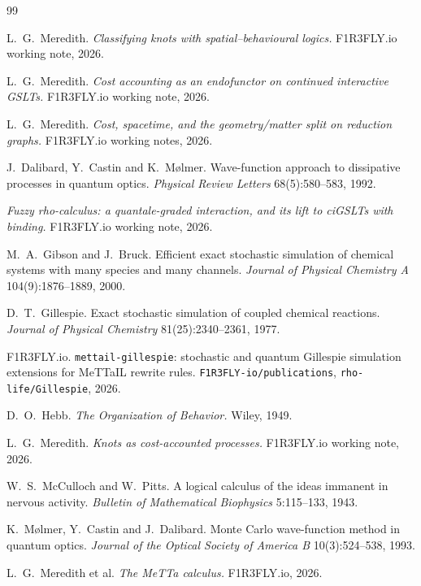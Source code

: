\documentclass[11pt,a4paper]{article}
\theoremstyle{plain}
\theoremstyle{definition}
\theoremstyle{remark}
\begin{document}
\begin{thebibliography}{99}

 L.\ G.\ Meredith. \emph{Classifying knots with spatial--behavioural logics.}
F1R3FLY.io working note, 2026.

 L.\ G.\ Meredith. \emph{Cost accounting as an endofunctor on continued
interactive GSLTs.} F1R3FLY.io working note, 2026.

 L.\ G.\ Meredith. \emph{Cost, spacetime, and the geometry/matter split on
reduction graphs.} F1R3FLY.io working notes, 2026.

 J.\ Dalibard, Y.\ Castin and K.\ M\o lmer. Wave-function approach to dissipative
processes in quantum optics. \emph{Physical Review Letters} 68(5):580--583, 1992.

 \emph{Fuzzy rho-calculus: a quantale-graded interaction, and its lift to ciGSLTs with
binding.} F1R3FLY.io working note, 2026.

 M.\ A.\ Gibson and J.\ Bruck. Efficient exact stochastic simulation of
chemical systems with many species and many channels. \emph{Journal of Physical Chemistry A}
104(9):1876--1889, 2000.

 D.\ T.\ Gillespie. Exact stochastic simulation of coupled chemical reactions.
\emph{Journal of Physical Chemistry} 81(25):2340--2361, 1977.

 F1R3FLY.io. \texttt{mettail-gillespie}: stochastic and quantum Gillespie
simulation extensions for MeTTaIL rewrite rules. \texttt{F1R3FLY-io/publications},
\texttt{rho-life/Gillespie}, 2026.

 D.\ O.\ Hebb. \emph{The Organization of Behavior.} Wiley, 1949.

 L.\ G.\ Meredith. \emph{Knots as cost-accounted processes.} F1R3FLY.io working note,
2026.

 W.\ S.\ McCulloch and W.\ Pitts. A logical calculus of the ideas immanent in nervous
activity. \emph{Bulletin of Mathematical Biophysics} 5:115--133, 1943.

 K.\ M\o lmer, Y.\ Castin and J.\ Dalibard. Monte Carlo wave-function method in quantum
optics. \emph{Journal of the Optical Society of America B} 10(3):524--538, 1993.

 L.\ G.\ Meredith et al. \emph{The MeTTa calculus.} F1R3FLY.io, 2026.


\end{thebibliography}
\end{document}
